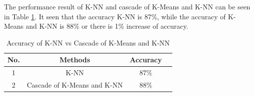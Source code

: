 \documentclass[conference]{IEEEtran}
\begin{document}
The performance result of K-NN and cascade of K-Means and K-NN can be seen in Table \ref{table_result}. It seen that the accuracy K-NN is 87\%, while the accuracy of K-Means and K-NN is 88\% or there is 1\% increase of accuracy. 

\begin{table}[!t]
\renewcommand{\arraystretch}{1.3}
\centering
\caption{Accuracy of K-NN vs Cascade of K-Means and K-NN}
\label{table_result}
\begin{tabular}{|c|c|c|c|}
\hline
No. & Methods & Accuracy\\
\hline
1 & K-NN & 87\%\\
\hline
2 & Cascade of K-Means and K-NN & 88\%\\
\hline
\end{tabular}
\end{table}





%
%
\end{document}

